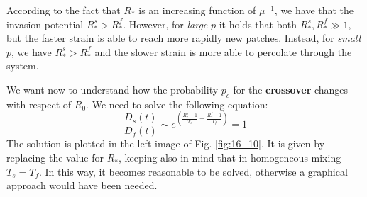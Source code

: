 \documentclass[../main/main.tex]{subfiles}
\begin{document}
According to the fact that $R_*$ is an increasing function of $\mu^{-1}$, we have that the invasion potential $R_*^s > R_*^f$. However, for \textit{large} $p$ it holds that both $R_*^s, R_*^f \gg 1$, but the faster strain is able to reach more rapidly new patches.
Instead, for \textit{small} $p$, we have $R_*^s > R_*^f$ and the slower strain is more able to percolate through the system.

We want now to understand how the probability $p_c$ for the \textbf{crossover} changes with respect of $R_0$. We need to solve the following equation:
\begin{equation}
    \frac{D_s(t)}{D_f(t)} \sim e^{\left( \frac{R_*^s -1}{T_s}- \frac{R_*^f -1}{T_f}\right) } = 1
\end{equation}
The solution is plotted in the left image of Fig. \ref{fig:16_10}.
It is given by replacing the value for $R_*$, keeping also in mind that in homogeneous mixing $T_s = T_f$.  In this way, it becomes reasonable to be solved, otherwise a graphical approach would have been needed.
\end{document}
